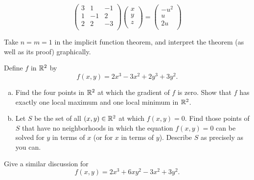 \mySolve
\begin{equation*}
    \begin{pmatrix}
        3 &  1 & -1 \\
        1 & -1 &  2 \\
        2 &  2 & -3 \\
    \end{pmatrix}
    \begin{pmatrix}
        x \\ y \\ z \\
    \end{pmatrix} = 
    \begin{pmatrix}
        -u^2 \\ u \\ 2u \\
    \end{pmatrix}
\end{equation*}


\begin{myexercise}
    \label{ex:9.20}
    Take $n = m = 1$ in the implicit function theorem, and interpret the theorem (as well as its proof) graphically.
\end{myexercise}


\begin{myexercise}
    \label{ex:9.21}
    Define $f$ in ${\protect\mathbb R}^2$ by
    \begin{equation*}
        f(x,y) = 2x^3-3x^2+2y^3+3y^2.
    \end{equation*}
    \begin{enumerate}[(a)]
        \item Find the four points in ${\protect\mathbb R}^2$ at which the gradient of $f$ is zero. 
        Show that $f$ has exactly one local maximum and one local minimum in ${\protect\mathbb R}^2$.
        \item Let $S$ be the set of all $(x, y) \in {\protect\mathbb R}^2$ at which $f(x, y) = 0$. 
        Find those points of $S$ that have no neighborhoods in which the equation $f(x, y) = 0$ can be solved for $y$ in terms of $x$ 
        (or for $x$ in terms of $y$). 
        Describe $S$ as precisely as you can.
    \end{enumerate}
\end{myexercise}


\begin{myexercise}
    \label{ex:9.22}
    Give a similar discussion for
    \begin{equation*}
        f(x,y)=2x^3+6xy^2-3x^2+3y^2.
    \end{equation*}
\end{myexercise}


